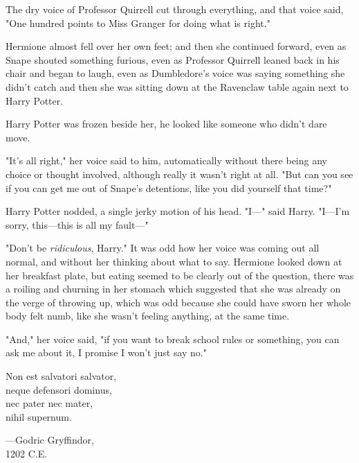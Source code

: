 The dry voice of Professor Quirrell cut through everything, and that voice
said, "One hundred points to Miss Granger for doing what is right."

Hermione almost fell over her own feet; and then she continued forward, even as
Snape shouted something furious, even as Professor Quirrell leaned back in his
chair and began to laugh, even as Dumbledore's voice was saying something she
didn't catch and then she was sitting down at the Ravenclaw table again next to
Harry Potter.

Harry Potter was frozen beside her, he looked like someone who didn't dare move.

"It's all right," her voice said to him, automatically without there being any
choice or thought involved, although really it wasn't right at all. "But can
you see if you can get me out of Snape's detentions, like you did yourself that
time?"

Harry Potter nodded, a single jerky motion of his head. "I---" said Harry.
"I---I'm sorry, this---this is all my fault---"

"Don't be \emph{ridiculous}, Harry." It was odd how her voice was coming out
all normal, and without her thinking about what to say. Hermione looked down at
her breakfast plate, but eating seemed to be clearly out of the question, there
was a roiling and churning in her stomach which suggested that she was already
on the verge of throwing up, which was odd because she could have sworn her
whole body felt numb, like she wasn't feeling anything, at the same time.

"And," her voice said, "if you want to break school rules or something, you can
ask me about it, I promise I won't just say no."
\later
\begin{center}
Non est salvatori salvator,\\
neque defensori dominus,\\
nec pater nec mater,\\
nihil supernum.

---Godric Gryffindor,\\
1202 C.E.
\end{center}
